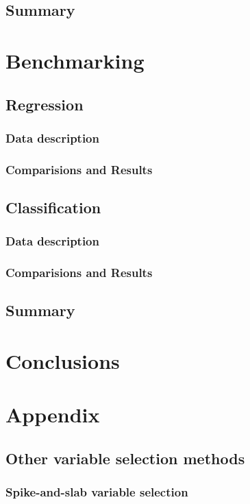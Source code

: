 \documentclass[12pt,letterpaper]{article}
\begin{document}
\subsection{Summary}
\pagebreak

\section{Benchmarking}

\subsection{Regression}
\subsubsection{Data description}
\subsubsection{Comparisions and Results}
\subsection{Classification}
\subsubsection{Data description}
\subsubsection{Comparisions and Results}

\subsection{Summary}

\pagebreak

\section{Conclusions}
\pagebreak
\section{Appendix}
\subsection{Other variable selection methods}
\subsubsection{Spike-and-slab variable selection}
\end{document}
